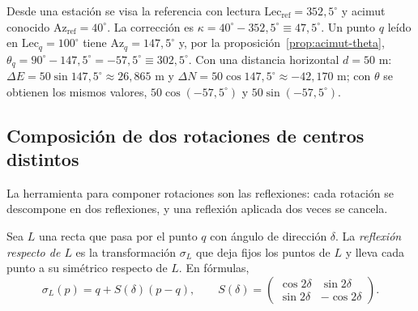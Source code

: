 \begin{ejemplo}
Desde una estación se visa la referencia con lectura \(\mathrm{Lec}_{\text{ref}}=352{,}5^\circ\)
y acimut conocido \(\mathrm{Az}_{\text{ref}}=40^\circ\). La corrección es
\(\kappa=40^\circ-352{,}5^\circ\equiv47{,}5^\circ\). Un punto \(q\) leído en
\(\mathrm{Lec}_q=100^\circ\) tiene \(\mathrm{Az}_q=147{,}5^\circ\) y, por la
proposición~\ref{prop:acimut-theta}, \(\theta_q=90^\circ-147{,}5^\circ=-57{,}5^\circ\equiv302{,}5^\circ\).
Con una distancia horizontal \(d=50\) m:
\(\Delta E=50\sin147{,}5^\circ\approx26{,}865\) m y \(\Delta N=50\cos147{,}5^\circ\approx-42{,}170\) m;
con \(\theta\) se obtienen los mismos valores, \(50\cos(-57{,}5^\circ)\) y \(50\sin(-57{,}5^\circ)\).

\begin{center}
\end{center}
\end{ejemplo}

\subsection{Composición de dos rotaciones de centros distintos}\label{sec:composicion-rotaciones}

La herramienta para componer rotaciones son las reflexiones: cada rotación se descompone en
dos reflexiones, y una reflexión aplicada dos veces se cancela.

\begin{definicion}
Sea \(L\) una recta que pasa por el punto \(q\) con ángulo de dirección \(\delta\). La
\emph{reflexión respecto de \(L\)} es la transformación \(\sigma_L\) que deja fijos los puntos
de \(L\) y lleva cada punto a su simétrico respecto de \(L\). En fórmulas,
\[
\sigma_L(p)=q+S(\delta)(p-q),\qquad
S(\delta)=\begin{pmatrix}\cos2\delta&\sin2\delta\\ \sin2\delta&-\cos2\delta\end{pmatrix}.
\]
\end{definicion}

